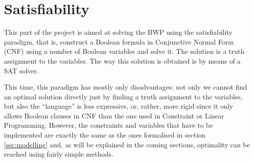 \section{Satisfiability}
\label{sec:satisfiability}

This part of the project is aimed at solving the BWP using the
satisfiability paradigm, that is, construct a Boolean formula
in Conjunctive Normal Form (CNF) using a number of Boolean
variables and solve it. The solution is a truth assignment to
the variables. The way this solution is obtained is by means
of a SAT solver.

\hfill

This time, this paradigm has mostly only disadvantages: not only
we cannot find an optimal solution directly just by finding
a truth assignment to the variables, but also the ``language''
is less expressive, or, rather, more rigid since it only allows
Boolean clauses in CNF than the one used in Constraint or Linear
Programming. However, the constraints and variables that have
to be implemented are exactly the same as the ones formalised
in section \ref{sec:modelling} and, as will be explained in the
coming sections, optimality can be reached using fairly simple
methods.

\hfill

